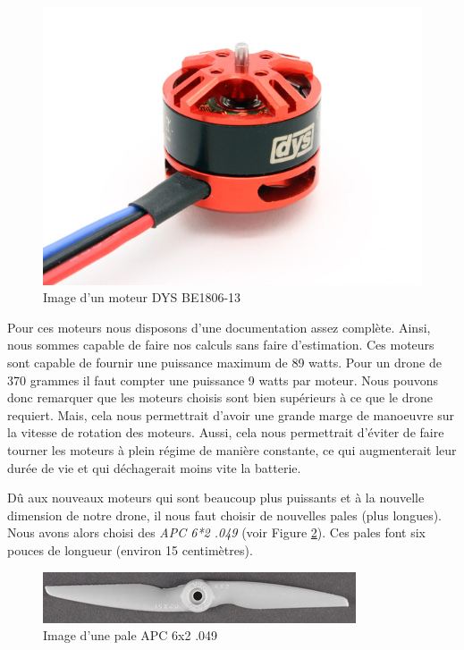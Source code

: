 \documentclass[a4paper,10pt]{report}
\begin{document}
      \begin{figure}[htbp]
	\centering
	\includegraphics[scale = 0.25]{img/dys.jpg}
	\caption{Image d'un moteur DYS BE1806-13}
	\label{dys}
      \end{figure}

      Pour ces moteurs nous disposons d'une documentation assez complète. 
Ainsi, nous sommes capable de faire nos calculs sans faire d'estimation. Ces 
moteurs sont capable de fournir une puissance maximum de 89 watts. Pour un 
drone de 370 grammes il faut compter une puissance 9 watts par moteur. Nous 
pouvons donc remarquer que les moteurs choisis sont bien supérieurs à ce que 
le drone requiert. Mais, cela nous permettrait d'avoir une grande marge de 
manoeuvre sur la vitesse de rotation des moteurs. Aussi, cela nous permettrait 
d'éviter de faire tourner les moteurs à plein régime de manière constante, ce 
qui augmenterait leur durée de vie et qui déchagerait moins vite la batterie.

      Dû aux nouveaux moteurs qui sont beaucoup plus puissants et à la 
nouvelle dimension de notre drone, il nous faut choisir de nouvelles pales 
(plus longues). Nous avons alors choisi des \textit{APC 6*2 .049} (voir Figure 
\ref{pale}). Ces pales font six pouces de longueur (environ 15 centimètres).

      \begin{figure}[htbp]
	\centering
	\includegraphics[scale = 0.4]{img/pale.jpg}
	\caption{Image d'une pale APC 6x2 .049}
	\label{pale}
      \end{figure}
      
\end{document}
